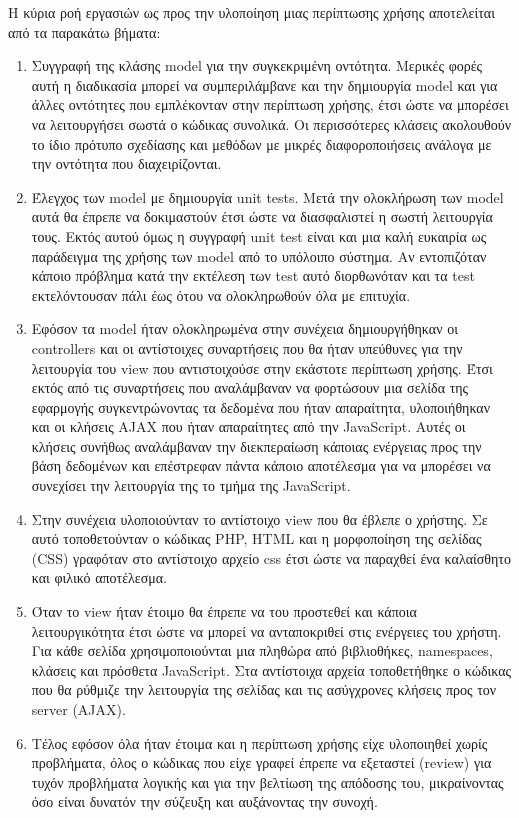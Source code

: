 Η κύρια ροή εργασιών ως προς την υλοποίηση μιας περίπτωσης χρήσης αποτελείται από τα παρακάτω βήματα:
\begin{enumerate}
\item Συγγραφή της κλάσης model για την συγκεκριμένη οντότητα. Μερικές φορές αυτή η διαδικασία μπορεί να συμπεριλάμβανε και την δημιουργία model και για άλλες οντότητες που εμπλέκονταν στην περίπτωση χρήσης, έτσι ώστε να μπορέσει να λειτουργήσει σωστά ο κώδικας συνολικά. Οι περισσότερες κλάσεις ακολουθούν το ίδιο πρότυπο σχεδίασης και μεθόδων με μικρές διαφοροποιήσεις ανάλογα με την οντότητα που διαχειρίζονται. 
\item Έλεγχος των model με δημιουργία unit tests. Μετά την ολοκλήρωση των model αυτά θα έπρεπε να δοκιμαστούν έτσι ώστε να διασφαλιστεί η σωστή λειτουργία τους. Εκτός αυτού όμως η συγγραφή unit test είναι και μια καλή ευκαιρία ως παράδειγμα της χρήσης των model από το υπόλοιπο σύστημα. Αν εντοπιζόταν κάποιο πρόβλημα κατά την εκτέλεση των test αυτό διορθωνόταν και τα test εκτελόντουσαν πάλι έως ότου να ολοκληρωθούν όλα με επιτυχία.
\item Εφόσον τα model ήταν ολοκληρωμένα στην συνέχεια δημιουργήθηκαν οι controllers και οι αντίστοιχες συναρτήσεις που θα ήταν υπεύθυνες για την λειτουργία του view που αντιστοιχούσε στην εκάστοτε περίπτωση χρήσης. Έτσι εκτός από τις συναρτήσεις που αναλάμβαναν να φορτώσουν μια σελίδα της εφαρμογής συγκεντρώνοντας τα δεδομένα που ήταν απαραίτητα, υλοποιήθηκαν και οι κλήσεις AJAX που ήταν απαραίτητες από την JavaScript. Αυτές οι κλήσεις συνήθως αναλάμβαναν την διεκπεραίωση κάποιας ενέργειας προς την βάση δεδομένων και επέστρεφαν πάντα κάποιο αποτέλεσμα για να μπορέσει να συνεχίσει την λειτουργία της το τμήμα της JavaScript.
\item Στην συνέχεια υλοποιούνταν το αντίστοιχο view που θα έβλεπε ο χρήστης. Σε αυτό τοποθετούνταν ο κώδικας PHP, HTML και η μορφοποίηση της σελίδας (CSS) γραφόταν στο αντίστοιχο αρχείο css έτσι ώστε να παραχθεί ένα καλαίσθητο και φιλικό αποτέλεσμα.
\item Όταν το view ήταν έτοιμο θα έπρεπε να του προστεθεί και κάποια λειτουργικότητα έτσι ώστε να μπορεί να ανταποκριθεί στις ενέργειες του χρήστη. Για κάθε σελίδα χρησιμοποιούνται μια πληθώρα από βιβλιοθήκες, namespaces, κλάσεις και πρόσθετα JavaScript. Στα αντίστοιχα αρχεία τοποθετήθηκε ο κώδικας που θα ρύθμιζε την λειτουργία της σελίδας και τις ασύγχρονες κλήσεις προς τον server (AJAX). 
\item Τέλος εφόσον όλα ήταν έτοιμα και η περίπτωση χρήσης είχε υλοποιηθεί χωρίς προβλήματα, όλος ο κώδικας που είχε γραφεί έπρεπε να εξεταστεί (review) για τυχόν προβλήματα λογικής και για την βελτίωση της απόδοσης του, μικραίνοντας όσο είναι δυνατόν την σύζευξη και αυξάνοντας την συνοχή.
\end{enumerate}

